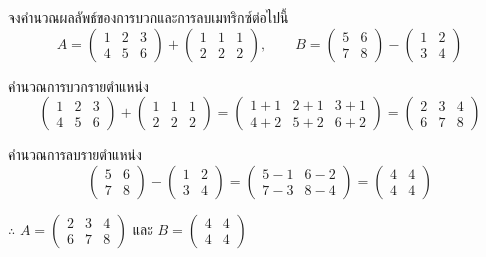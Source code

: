 \begin{ex}[การบวกและการลบเมทริกซ์]
\label{ex:matrix-add-sub}
จงคำนวณผลลัพธ์ของการบวกและการลบเมทริกซ์ต่อไปนี้
\[ A = \begin{pmatrix} 1 & 2 & 3 \\ 4 & 5 & 6 \end{pmatrix} + \begin{pmatrix} 1 & 1 & 1 \\ 2 & 2 & 2 \end{pmatrix}, \qquad B = \begin{pmatrix} 5 & 6 \\ 7 & 8 \end{pmatrix} - \begin{pmatrix} 1 & 2 \\ 3 & 4 \end{pmatrix} \]
\end{ex}
\begin{solution}
คำนวณการบวกรายตำแหน่ง \[ \begin{pmatrix} 1 & 2 & 3 \\ 4 & 5 & 6 \end{pmatrix} + \begin{pmatrix} 1 & 1 & 1 \\ 2 & 2 & 2 \end{pmatrix} = \begin{pmatrix} 1+1 & 2+1 & 3+1 \\ 4+2 & 5+2 & 6+2 \end{pmatrix} = \begin{pmatrix} 2 & 3 & 4 \\ 6 & 7 & 8 \end{pmatrix} \]

คำนวณการลบรายตำแหน่ง \[ \begin{pmatrix} 5 & 6 \\ 7 & 8 \end{pmatrix} - \begin{pmatrix} 1 & 2 \\ 3 & 4 \end{pmatrix} = \begin{pmatrix} 5-1 & 6-2 \\ 7-3 & 8-4 \end{pmatrix} = \begin{pmatrix} 4 & 4 \\ 4 & 4 \end{pmatrix} \]

$\therefore$ $A = \begin{pmatrix} 2 & 3 & 4 \\ 6 & 7 & 8 \end{pmatrix}$ และ $B = \begin{pmatrix} 4 & 4 \\ 4 & 4 \end{pmatrix}$ \solhere
\end{solution}

